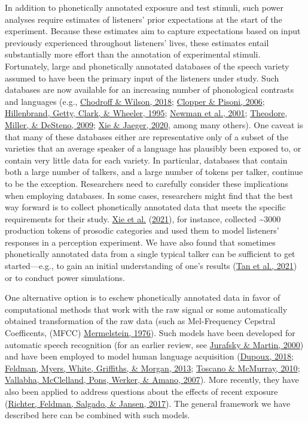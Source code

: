 \documentclass[
  11pt,
  english,
  man,floatsintext]{apa6}
\begin{document}
In addition to phonetically annotated exposure and test stimuli, such power analyses require estimates of listeners' prior expectations at the start of the experiment. Because these estimates aim to capture expectations based on input previously experienced throughout listeners' lives, these estimates entail substantially more effort than the annotation of experimental stimuli. Fortunately, large and phonetically annotated databases of the speech variety assumed to have been the primary input of the listeners under study. Such databases are now available for an increasing number of phonological contrasts and languages (e.g., \protect\hyperlink{ref-chodroff-wilson2018}{Chodroff \& Wilson, 2018}; \protect\hyperlink{ref-clopper-pisoni2006}{Clopper \& Pisoni, 2006}; \protect\hyperlink{ref-hillenbrand1995}{Hillenbrand, Getty, Clark, \& Wheeler, 1995}; \protect\hyperlink{ref-newman2001}{Newman et al., 2001}; \protect\hyperlink{ref-theodore2009}{Theodore, Miller, \& DeSteno, 2009}; \protect\hyperlink{ref-xie-jaeger2020}{Xie \& Jaeger, 2020}, among many others). One caveat is that many of these databases either are representative only of a subset of the varieties that an average speaker of a language has plausibly been exposed to, or contain very little data for each variety. In particular, databases that contain both a large number of talkers, and a large number of tokens per talker, continue to be the exception. Researchers need to carefully consider these implications when employing databases. In some cases, researchers might find that the best way forward is to collect phonetically annotated data that meets the specific requirements for their study. \protect\hyperlink{ref-xie2021cognition}{Xie et al.} (\protect\hyperlink{ref-xie2021cognition}{2021}), for instance, collected \textasciitilde3000 production tokens of prosodic categories and used them to model listeners' responses in a perception experiment. We have also found that sometimes phonetically annotated data from a single typical talker can be sufficient to get started---e.g., to gain an initial understanding of one's results (\protect\hyperlink{ref-tan2021}{Tan et al., 2021}) or to conduct power simulations.

One alternative option is to eschew phonetically annotated data in favor of computational methods that work with the raw signal or some automatically obtained transformation of the raw data (such as Mel-Frequency Cepstral Coefficents, (MFCC) \protect\hyperlink{ref-Mermelstein1976}{Mermelstein, 1976}). Such models have been developed for automatic speech recognition (for an earlier review, see \protect\hyperlink{ref-jurafsky-martin2000}{Jurafsky \& Martin, 2000}) and have been employed to model human language acquisition (\protect\hyperlink{ref-dupoux2018}{Dupoux, 2018}; \protect\hyperlink{ref-feldman2013}{Feldman, Myers, White, Griffiths, \& Morgan, 2013}; \protect\hyperlink{ref-toscano-mcmurray2010}{Toscano \& McMurray, 2010}; \protect\hyperlink{ref-vallabha2007}{Vallabha, McClelland, Pons, Werker, \& Amano, 2007}). More recently, they have also been applied to address questions about the effects of recent exposure (\protect\hyperlink{ref-richter2017}{Richter, Feldman, Salgado, \& Jansen, 2017}). The general framework we have described here can be combined with such models.
\end{document}
